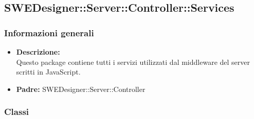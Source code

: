   \subsection{SWEDesigner::Server::Controller::Services}
    \subsubsection{Informazioni generali}
      \begin{itemize}
        \item \textbf{Descrizione: }\\
        Questo package contiene tutti i servizi utilizzati dal middleware del server scritti in JavaScript.
        \item \textbf{Padre: }SWEDesigner::Server::Controller
      \end{itemize}
    \subsubsection{Classi}

